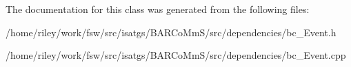 The documentation for this class was generated from the following files\+:\begin{DoxyCompactItemize}
\item 
/home/riley/work/fsw/src/isatgs/\+B\+A\+R\+Co\+Mm\+S/src/dependencies/bc\+\_\+\+Event.\+h\item 
/home/riley/work/fsw/src/isatgs/\+B\+A\+R\+Co\+Mm\+S/src/dependencies/bc\+\_\+\+Event.\+cpp\end{DoxyCompactItemize}
